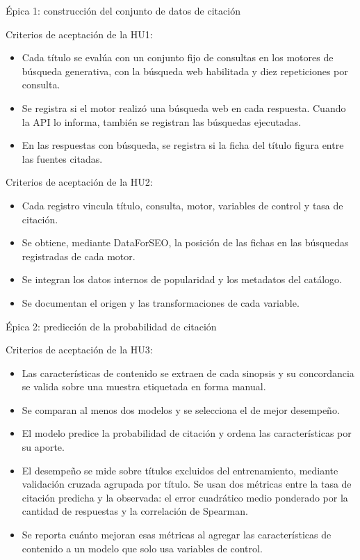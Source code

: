 \documentclass[
11pt, %
codirector, %
]{charter}
\begin{document}
Épica 1: construcción del conjunto de datos de citación

Criterios de aceptación de la HU1:
\begin{itemize}
	\item Cada título se evalúa con un conjunto fijo de consultas en los motores de búsqueda generativa, con la búsqueda web habilitada y diez repeticiones por consulta.
	\item Se registra si el motor realizó una búsqueda web en cada respuesta. Cuando la API lo informa, también se registran las búsquedas ejecutadas.
	\item En las respuestas con búsqueda, se registra si la ficha del título figura entre las fuentes citadas.
\end{itemize}

Criterios de aceptación de la HU2:
\begin{itemize}
	\item Cada registro vincula título, consulta, motor, variables de control y tasa de citación.
	\item Se obtiene, mediante DataForSEO, la posición de las fichas en las búsquedas registradas de cada motor.
	\item Se integran los datos internos de popularidad y los metadatos del catálogo.
	\item Se documentan el origen y las transformaciones de cada variable.
\end{itemize}

Épica 2: predicción de la probabilidad de citación

Criterios de aceptación de la HU3:
\begin{itemize}
	\item Las características de contenido se extraen de cada sinopsis y su concordancia se valida sobre una muestra etiquetada en forma manual.
	\item Se comparan al menos dos modelos y se selecciona el de mejor desempeño.
	\item El modelo predice la probabilidad de citación y ordena las características por su aporte.
	\item El desempeño se mide sobre títulos excluidos del entrenamiento, mediante validación cruzada agrupada por título. Se usan dos métricas entre la tasa de citación predicha y la observada: el error cuadrático medio ponderado por la cantidad de respuestas y la correlación de Spearman.
	\item Se reporta cuánto mejoran esas métricas al agregar las características de contenido a un modelo que solo usa variables de control.
\end{itemize}
\end{document}
